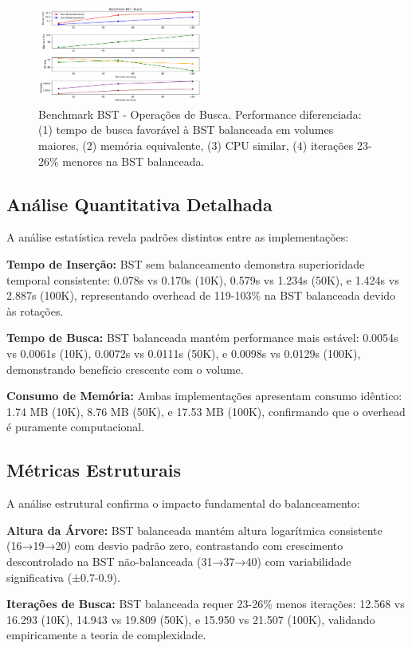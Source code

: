 \documentclass[conference]{IEEEtran}
\begin{document}
\begin{figure}[htbp]
\centerline{\includegraphics[width=0.48\textwidth]{benchmark_bst_busca.png}}
\caption{Benchmark BST - Operações de Busca. Performance diferenciada: (1) tempo de busca favorável à BST balanceada em volumes maiores, (2) memória equivalente, (3) CPU similar, (4) iterações 23-26\% menores na BST balanceada.}
\label{fig:benchmark_busca}
\end{figure}

\subsection{Análise Quantitativa Detalhada}
A análise estatística revela padrões distintos entre as implementações:

\textbf{Tempo de Inserção:} BST sem balanceamento demonstra superioridade temporal consistente: 0.078s vs 0.170s (10K), 0.579s vs 1.234s (50K), e 1.424s vs 2.887s (100K), representando overhead de 119-103\% na BST balanceada devido às rotações.

\textbf{Tempo de Busca:} BST balanceada mantém performance mais estável: 0.0054s vs 0.0061s (10K), 0.0072s vs 0.0111s (50K), e 0.0098s vs 0.0129s (100K), demonstrando benefício crescente com o volume.

\textbf{Consumo de Memória:} Ambas implementações apresentam consumo idêntico: 1.74 MB (10K), 8.76 MB (50K), e 17.53 MB (100K), confirmando que o overhead é puramente computacional.

\subsection{Métricas Estruturais}
A análise estrutural confirma o impacto fundamental do balanceamento:

\textbf{Altura da Árvore:} BST balanceada mantém altura logarítmica consistente (16→19→20) com desvio padrão zero, contrastando com crescimento descontrolado na BST não-balanceada (31→37→40) com variabilidade significativa (±0.7-0.9).

\textbf{Iterações de Busca:} BST balanceada requer 23-26\% menos iterações: 12.568 vs 16.293 (10K), 14.943 vs 19.809 (50K), e 15.950 vs 21.507 (100K), validando empiricamente a teoria de complexidade.
\end{document}
